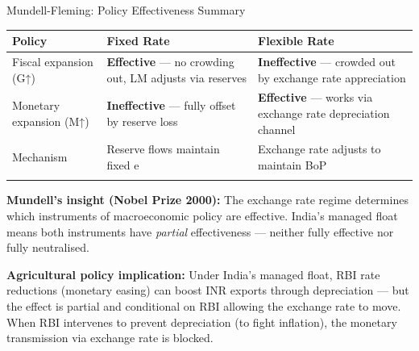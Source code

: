 \documentclass[
  ignorenonframetext,
  aspectratio=169,
]{beamer}
\makeatletter
\let\quarto@originallabel\label
\DeclareRobustCommand*{\label}[1]{\quarto@originallabel{#1}}
\makeatother
\begin{document}
\begin{frame}{Mundell-Fleming: Policy Effectiveness Summary}
\label{mundell-fleming-policy-effectiveness-summary}
\begin{longtable}[]{@{}
  >{\raggedright\arraybackslash}p{}
  >{\raggedright\arraybackslash}p{}
  >{\raggedright\arraybackslash}p{}@{}}
\toprule\noalign{}
\begin{minipage}[b]{\linewidth}\raggedright
Policy
\end{minipage} & \begin{minipage}[b]{\linewidth}\raggedright
Fixed Rate
\end{minipage} & \begin{minipage}[b]{\linewidth}\raggedright
Flexible Rate
\end{minipage} \\
\midrule\noalign{}
\endhead
Fiscal expansion (G↑) & \textbf{Effective} --- no crowding out, LM
adjusts via reserves & \textbf{Ineffective} --- crowded out by exchange
rate appreciation \\
Monetary expansion (M↑) & \textbf{Ineffective} --- fully offset by
reserve loss & \textbf{Effective} --- works via exchange rate
depreciation channel \\
Mechanism & Reserve flows maintain fixed e & Exchange rate adjusts to
maintain BoP \\
\bottomrule\noalign{}
\end{longtable}

\textbf{Mundell's insight (Nobel Prize 2000):} The exchange rate regime
determines which instruments of macroeconomic policy are effective.
India's managed float means both instruments have \emph{partial}
effectiveness --- neither fully effective nor fully neutralised.

\textbf{Agricultural policy implication:} Under India's managed float,
RBI rate reductions (monetary easing) can boost INR exports through
depreciation --- but the effect is partial and conditional on RBI
allowing the exchange rate to move. When RBI intervenes to prevent
depreciation (to fight inflation), the monetary transmission via
exchange rate is blocked.
\end{frame}
\end{document}
